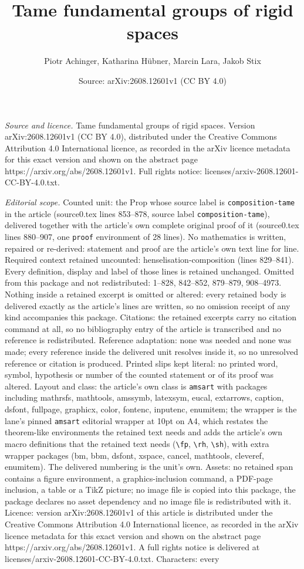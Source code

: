 \documentclass[10pt,a4paper]{amsart}
\title[Tame fundamental groups of rigid spaces]{Tame fundamental groups of rigid spaces}
\author{Piotr Achinger, Katharina H\"ubner, Marcin Lara, Jakob Stix}
\date{Source: arXiv:2608.12601v1 (CC BY 4.0)}
\begin{document}
\maketitle

\noindent\emph{Source and licence.} Tame fundamental groups of rigid spaces. Version arXiv:2608.12601v1 (CC BY 4.0), distributed under the Creative Commons Attribution 4.0 International licence, as recorded in the arXiv licence metadata for this exact version and shown on the abstract page https://arxiv.org/abs/2608.12601v1. Full rights notice: licenses/arxiv-2608.12601-CC-BY-4.0.txt.\par\smallskip

\noindent\textit{Editorial scope.} Counted unit: the Prop whose source label is \texttt{composition-tame} in the article (source0.tex lines 853--878, source label \texttt{composition-tame}), delivered together with the article's own complete original proof of it (source0.tex lines 880--907, one \texttt{proof} environment of 28 lines). No mathematics is written, repaired or re-derived: statement and proof are the article's own text line for line. Required context retained uncounted: henselisation-composition (lines 829--841). Every definition, display and label of those lines is retained unchanged. Omitted from this package and not redistributed: 1--828, 842--852, 879--879, 908--4973. Nothing inside a retained excerpt is omitted or altered: every retained body is delivered exactly as the article's lines are written, so no omission receipt of any kind accompanies this package. Citations: the retained excerpts carry no citation command at all, so no bibliography entry of the article is transcribed and no reference is redistributed. Reference adaptation: none was needed and none was made; every reference inside the delivered unit resolves inside it, so no unresolved reference or citation is produced. Printed slips kept literal: no printed word, symbol, hypothesis or number of the counted statement or of its proof was altered. Layout and class: the article's own class is \texttt{amsart} with packages including mathrsfs, mathtools, amssymb, latexsym, eucal, extarrows, caption, dsfont, fullpage, graphicx, color, fontenc, inputenc, enumitem; the wrapper is the lane's pinned \texttt{amsart} editorial wrapper at 10pt on A4, which restates the theorem-like environments the retained text needs and adds the article's own macro definitions that the retained text needs (\texttt{\textbackslash fp}, \texttt{\textbackslash rh}, \texttt{\textbackslash sh}), with extra wrapper packages (bm, bbm, dsfont, xspace, cancel, mathtools, cleveref, enumitem). The delivered numbering is the unit's own. Assets: no retained span contains a figure environment, a graphics-inclusion command, a PDF-page inclusion, a table or a TikZ picture; no image file is copied into this package, the package declares no asset dependency and no image file is redistributed with it. Licence: version arXiv:2608.12601v1 of this article is distributed under the Creative Commons Attribution 4.0 International licence, as recorded in the arXiv licence metadata for this exact version and shown on the abstract page https://arxiv.org/abs/2608.12601v1. A full rights notice is delivered at licenses/arxiv-2608.12601-CC-BY-4.0.txt. Characters: every 
\end{document}
